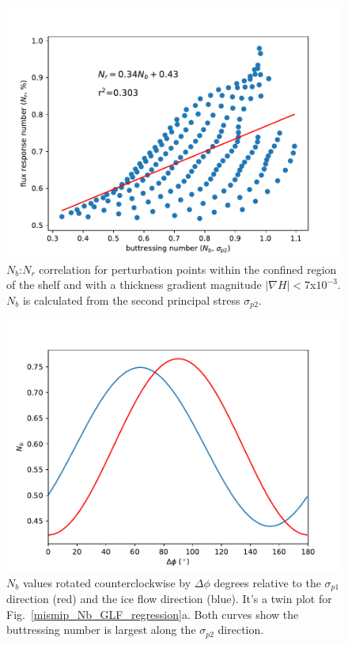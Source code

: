 \documentclass[tc, manuscript]{copernicus}
\begin{document}
\begin{figure}
	\centering
	\includegraphics[width=1\linewidth]{figs/sigma_p2_example.pdf}
	\caption{$N_b$:$N_r$ correlation for perturbation points within the confined region of the shelf and with a thickness gradient magnitude $\left|\nabla H\right|<7$x$10^{-3}$. $N_b$ is calculated from the second principal stress $\sigma_{p2}$.}
	\label{sigma_p2_example}
\end{figure}

\begin{figure}
	\centering
	\includegraphics[width=1\linewidth]{figs/Nb_Deltaphi.pdf}
	\caption{$N_b$ values rotated counterclockwise by $\Delta\phi$ degrees relative to the $\sigma_{p1}$ direction (red) and the ice flow direction (blue). It's a twin plot for Fig.~\ref{mismip_Nb_GLF_regression}a. Both curves show the buttressing number is largest along the $\sigma_{p2}$ direction.}
	\label{Nb_Deltaphi}
\end{figure}
\end{document}
